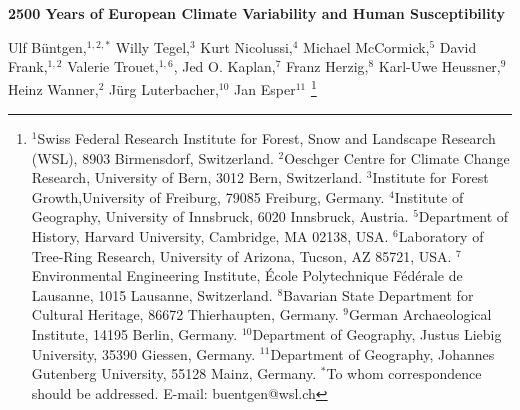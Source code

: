 \documentclass[10pt,a4paper,twoside,onecolumn]{article}
\author{Liz}
\begin{document}
\setcounter{page}{578}
{\Huge\textbf{2500 Years of European Climate Variability and Human Susceptibility }}

{\small Ulf Büntgen,$^{1,2,\ast}$ Willy Tegel,$^{3}$ Kurt Nicolussi,$^{4}$ Michael McCormick,$^{5}$ David Frank,$^{1,2}$ Valerie Trouet,$^{1,6}$,
Jed O. Kaplan,$^{7}$ Franz Herzig,$^{8}$ Karl-Uwe Heussner,$^{9}$ Heinz Wanner,$^{2}$ Jürg Luterbacher,$^{10}$ Jan Esper$^{11}$} \footnote{$^{1}$Swiss Federal Research Institute for Forest, Snow and Landscape Research (WSL), 8903 Birmensdorf, Switzerland.
$^{2}$Oeschger Centre for Climate Change Research, University of Bern, 3012 Bern, Switzerland.
$^{3}$Institute for Forest Growth,University of Freiburg, 79085 Freiburg, Germany.
$^{4}$Institute of Geography, University of Innsbruck, 6020 Innsbruck, Austria.
$^{5}$Department of History,
Harvard University, Cambridge, MA 02138, USA.
$^{6}$Laboratory of Tree-Ring Research, University of Arizona, Tucson, AZ 85721, USA.
$^{7}$Environmental Engineering Institute, École Polytechnique
Fédérale de Lausanne, 1015 Lausanne, Switzerland.
$^{8}$Bavarian State Department for Cultural Heritage, 86672 Thierhaupten,
Germany.
$^{9}$German Archaeological Institute, 14195 Berlin, Germany.
$^{10}$Department of Geography, Justus Liebig University, 35390 Giessen,
Germany.
$^{11}$Department of Geography, Johannes Gutenberg University,
55128 Mainz, Germany.
$^{\ast}$To whom correspondence should be addressed. E-mail: buentgen@wsl.ch}
\end{document}

